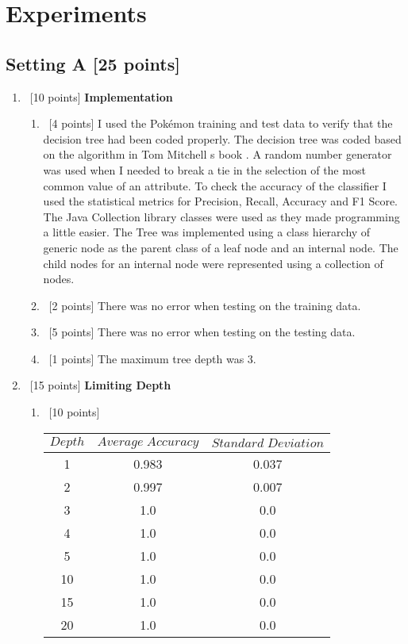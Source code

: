 \section{Experiments}
\label{sec:q1}

\subsection*{Setting A [25 points]}

\begin{enumerate}
\item ~[10 points] \textbf{Implementation}

  \begin{enumerate}
  \item ~[4 points] I used the Pok\'emon training and test data to verify that the decision tree had been coded properly. The decision tree was coded based on the algorithm in Tom Mitchell \textquotesingle s book \cite{Mitchell}. A random number generator was used when I needed to break a tie in the selection of the most common value of an attribute. To check the accuracy of the classifier I used the statistical metrics for Precision, Recall, Accuracy and F1 Score. The Java Collection library classes were used as they made programming a little easier. The Tree was implemented using a class hierarchy of generic node as the parent class of a leaf node and an internal node. The child nodes for an internal node were represented using a collection of nodes.
    
  \item ~[2 points]  There was no error when testing on the training data.
    
  \item ~[5 points] There was no error when testing on the testing data.
    
  \item ~[1 points] The maximum tree depth was 3.
  \end{enumerate}

\item ~[15 points] \textbf{Limiting Depth}

  \begin{enumerate}
  \item ~[10 points] 
    \begin{center}
    \begin{tabular}{c|c|c}
      $Depth$ & $Average \; Accuracy$ & $Standard \;Deviation$\\ \hline
      1 & 0.983 & 0.037\\
      2 &  0.997 & 0.007\\
       3 & 1.0 & 0.0\\
       4 & 1.0 & 0.0\\
       5 & 1.0 & 0.0\\
       10 &1.0 & 0.0\\
      15 & 1.0 & 0.0\\
      20 & 1.0 & 0.0
    \end{tabular}
  \end{center}
    

\end{enumerate}
\end{enumerate}
